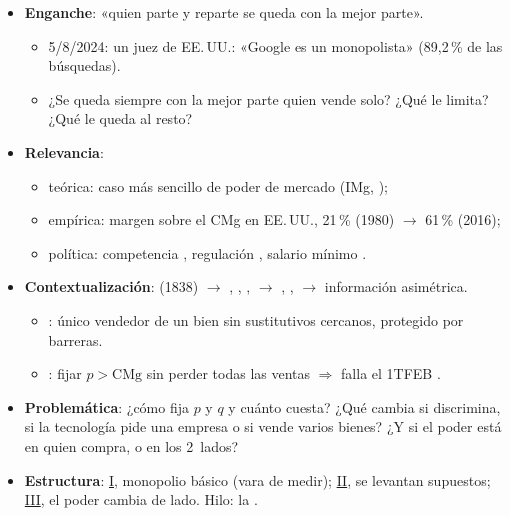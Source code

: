 \documentclass{article}
\begin{document}
\cabecerarepaso
\begin{columnas}

\begin{itemize}
\item \textbf{Enganche}: «quien parte y reparte se queda con la mejor parte».
  \begin{itemize}
  \item 5/8/2024: un juez de EE.\,UU.: «Google es un monopolista» (89,2\,\% de las búsquedas).
  \item ¿Se queda siempre con la mejor parte quien vende solo? ¿Qué le limita? ¿Qué le queda al resto?
  \end{itemize}
\item \textbf{Relevancia}:
  \begin{itemize}
  \item teórica: caso más sencillo de poder de mercado (IMg, );
  \item empírica: margen sobre el CMg en EE.\,UU., 21\,\% (1980) $\to$ 61\,\% (2016);
  \item política: competencia , regulación , salario mínimo .
  \end{itemize}
\item \textbf{Contextualización}:  (1838) $\to$ , , ,  $\to$ , ,  $\to$ información asimétrica.
  \begin{itemize}
  \item {}: único vendedor de un bien sin sustitutivos cercanos, protegido por barreras.
  \item {}: fijar $p>\mathrm{CMg}$ sin perder todas las ventas $\Rightarrow$ falla el 1TFEB .
  \end{itemize}
\item \textbf{Problemática}: ¿cómo fija $p$ y $q$ y cuánto cuesta? ¿Qué cambia si discrimina, si la tecnología pide una empresa o si vende varios bienes? ¿Y si el poder está en quien compra, o en los 2~lados?
\item \textbf{Estructura}: \hyperref[rep:I]{I}, monopolio básico (vara de medir); \hyperref[rep:II]{II}, se levantan supuestos; \hyperref[rep:III]{III}, el poder cambia de lado. Hilo: la .
\end{itemize}


\end{columnas}
\end{document}
